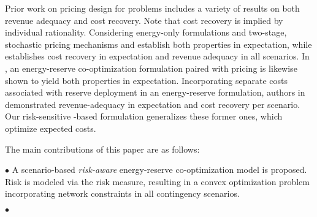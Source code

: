 Prior work on pricing design for \SCED{} problems includes a variety of results on both revenue adequacy and cost recovery. Note that cost recovery is implied by individual rationality. Considering energy-only formulations and two-stage, stochastic pricing mechanisms \cite{pritchard2010single} and \cite{morales2012pricing} establish both properties in expectation, while \cite{morales2014electricity} establishes cost recovery in expectation and revenue adequacy in all scenarios. In \cite{wong2007pricing}, an energy-reserve co-optimization formulation paired with \LMPmar{} pricing is likewise shown to yield both properties in expectation. 
Incorporating separate costs associated with reserve deployment in an energy-reserve formulation, authors in \cite{shi2022scenario} demonstrated revenue-adequacy in expectation and cost recovery per scenario. Our risk-sensitive \CVaR{}-based formulation generalizes these former ones, which optimize expected costs. 

The main contributions of this paper are as follows:
    
    \noindent $\bullet$ A scenario-based \emph{risk-aware} energy-reserve co-optimization model is proposed. Risk is modeled via the \CVaR{} risk measure, resulting in a convex optimization problem incorporating network constraints in all contingency scenarios. 
    
    \noindent $\bullet$ 
    
